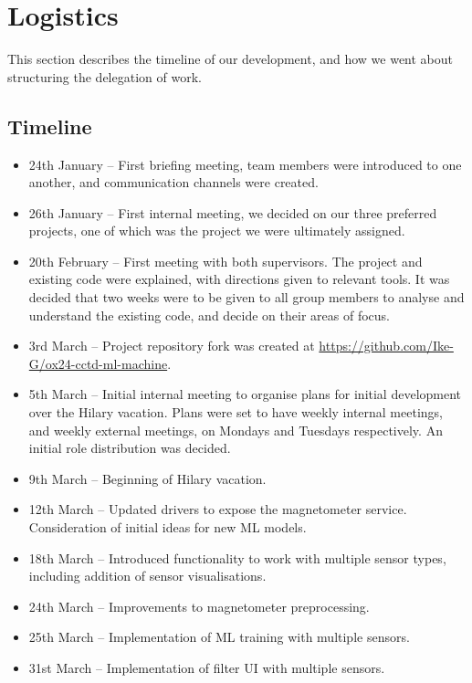 \documentclass{article}
\begin{document}
\section{Logistics}%
\label{sec:logistics}

This section describes the timeline of our development, and how we went about structuring the delegation of work.

\subsection{Timeline}%
\label{subsec:timeline}

\begin{itemize}
        \item 24th January -- First briefing meeting, team members were introduced to one another, and communication channels were created.
        \item 26th January -- First internal meeting, we decided on our three preferred projects, one of which was the project we were ultimately assigned.
        \item 20th February -- First meeting with both supervisors. The project and existing code were explained, with directions given to relevant tools. It was decided that two weeks were to be given to all group members to analyse and understand the existing code, and decide on their areas of focus.
        \item 3rd March -- Project repository fork was created at \url{https://github.com/Ike-G/ox24-cctd-ml-machine}.
        \item 5th March -- Initial internal meeting to organise plans for initial development over the Hilary vacation. Plans were set to have weekly internal meetings, and weekly external meetings, on Mondays and Tuesdays respectively. An initial role distribution was decided.
        \item 9th March -- Beginning of Hilary vacation.
        \item 12th March -- Updated drivers to expose the magnetometer service. Consideration of initial ideas for new ML models.
        \item 18th March -- Introduced functionality to work with multiple sensor types, including addition of sensor visualisations.
        \item 24th March -- Improvements to magnetometer preprocessing.
        \item 25th March -- Implementation of ML training with multiple sensors.
        \item 31st March -- Implementation of filter UI with multiple sensors.

\end{itemize}
\end{document}
